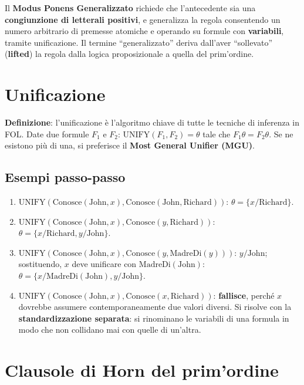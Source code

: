 \documentclass[11pt,a4paper]{report}
\begin{document}
Il \textbf{Modus Ponens Generalizzato} richiede che l'antecedente sia una \textbf{congiunzione di letterali positivi}, e generalizza la regola consentendo un numero arbitrario di premesse atomiche e operando su formule con \textbf{variabili}, tramite unificazione. Il termine ``generalizzato'' deriva dall'aver ``sollevato'' (\textbf{lifted}) la regola dalla logica proposizionale a quella del prim'ordine.

\section{Unificazione}

\textbf{Definizione}: l'unificazione è l'algoritmo chiave di tutte le tecniche di inferenza in FOL. Date due formule $F_1$ e $F_2$: $\text{UNIFY}(F_1,F_2)=\theta$ tale che $F_1\theta=F_2\theta$. Se ne esistono più di una, si preferisce il \textbf{Most General Unifier (MGU)}.

\subsection*{Esempi passo-passo}

\begin{enumerate}
  \item $\text{UNIFY}(\text{Conosce}(\text{John},x), \text{Conosce}(\text{John},\text{Richard}))$: $\theta=\{x/\text{Richard}\}$.
  \item $\text{UNIFY}(\text{Conosce}(\text{John},x), \text{Conosce}(y,\text{Richard}))$: $\theta=\{x/\text{Richard}, y/\text{John}\}$.
  \item $\text{UNIFY}(\text{Conosce}(\text{John},x), \text{Conosce}(y,\text{MadreDi}(y)))$: $y/\text{John}$; sostituendo, $x$ deve unificare con $\text{MadreDi}(\text{John})$: $\theta=\{x/\text{MadreDi}(\text{John}), y/\text{John}\}$.
  \item $\text{UNIFY}(\text{Conosce}(\text{John},x), \text{Conosce}(x,\text{Richard}))$: \textbf{fallisce}, perché $x$ dovrebbe assumere contemporaneamente due valori diversi. Si risolve con la \textbf{standardizzazione separata}: si rinominano le variabili di una formula in modo che non collidano mai con quelle di un'altra.
\end{enumerate}

\section{Clausole di Horn del prim'ordine}
\end{document}

